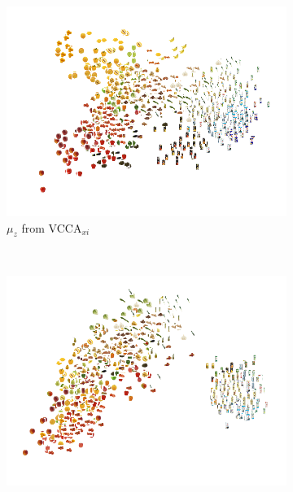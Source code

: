 \clearpage

\begin{figure}[p]
    \centering
    \begin{minipage}{\textwidth}
        \centering
        \begin{subfigure}[t]{0.48\textwidth}
        	\centering
        	\includegraphics[width=\textwidth]{PaperB/appendix/figures/vcca_private_xi/pca_vcca_xi.png}
        	\caption{$\mu_{z}$ from VCCA$_{x i}$}
        	\label{fig:pca_vcca_xi_z}
        \end{subfigure}~
        \begin{subfigure}[t]{0.48\textwidth}
    		\centering
    		\includegraphics[width=\textwidth]{PaperB/appendix/figures/vcca_private_xi/pca_z_vcca_private_xi_seed1.png}

\end{subfigure}
\end{minipage}
\end{figure}
